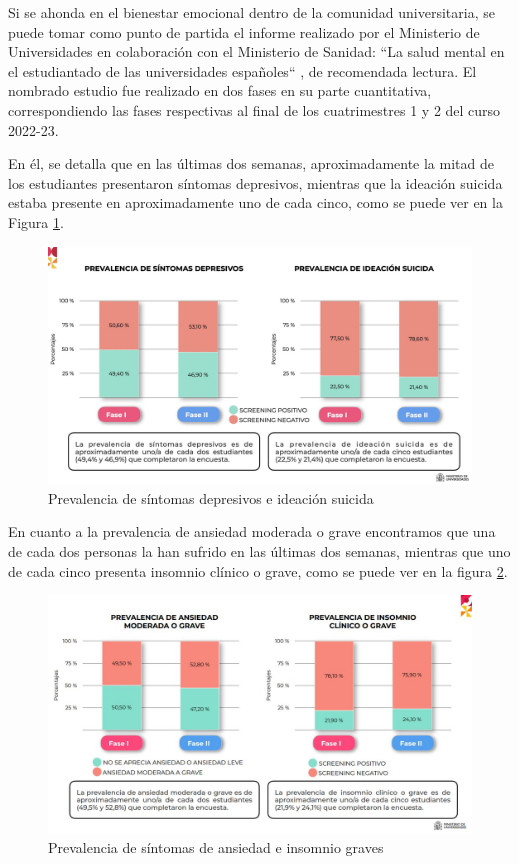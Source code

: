     Si se ahonda en el bienestar emocional dentro de la comunidad universitaria, se puede tomar como punto de partida el informe realizado por el Ministerio de Universidades en colaboración con el Ministerio de Sanidad: ``La salud mental en el estudiantado de las universidades españoles`` \cite{galache_gobierno_2023} \cite{ministerio_de_universidades_salud_2023}, de recomendada lectura. El nombrado estudio fue realizado en dos fases en su parte cuantitativa, correspondiendo las fases respectivas al final de los cuatrimestres 1 y 2 del curso 2022-23. 
    
    En él, se detalla que en las últimas dos semanas, aproximadamente la mitad de los estudiantes presentaron síntomas depresivos, mientras que la ideación suicida estaba presente en aproximadamente uno de cada cinco, como se puede ver en la Figura \ref{fig:intro:sintomas_depresivos_suicida}. 
    
    \begin{figure}[h]
        \centering
        \includegraphics[width=0.75\linewidth]{figures/Sintomas depresion suicidio.jpg}
        \caption[Prevalencia de síntomas depresivos e ideación suicida]{Prevalencia de síntomas depresivos e ideación suicida \cite{ministerio_de_universidades_salud_2023}}
        \label{fig:intro:sintomas_depresivos_suicida}
    \end{figure}
    
    En cuanto a la prevalencia de ansiedad moderada o grave encontramos que una de cada dos personas la han sufrido en las últimas dos semanas, mientras que uno de cada cinco presenta insomnio clínico o grave, como se puede ver en la figura \ref{fig:intro:sintomas_ansiedad_insomnio}. 
    
    \begin{figure}[h]
        \centering
        \includegraphics[width=0.75\linewidth]{figures/Sintomas ansiedad insomnio.JPG}
        \caption[Prevalencia de síntomas de ansiedad e insomnio graves]{Prevalencia de síntomas de ansiedad e insomnio graves \cite{ministerio_de_universidades_salud_2023}}
        \label{fig:intro:sintomas_ansiedad_insomnio}
    \end{figure}
    

